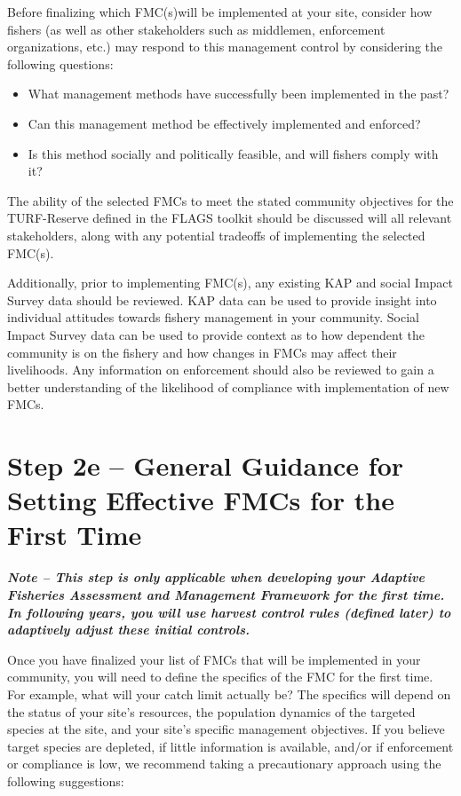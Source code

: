 \documentclass[]{book}
\begin{document}
Before finalizing which FMC(s)will be implemented at your site, consider
how fishers (as well as other stakeholders such as middlemen,
enforcement organizations, etc.) may respond to this management control
by considering the following questions:

\begin{itemize}
\item
  What management methods have successfully been implemented in the
  past?
\item
  Can this management method be effectively implemented and enforced?
\item
  Is this method socially and politically feasible, and will fishers
  comply with it?
\end{itemize}

The ability of the selected FMCs to meet the stated community objectives
for the TURF-Reserve defined in the FLAGS toolkit should be discussed
will all relevant stakeholders, along with any potential tradeoffs of
implementing the selected FMC(s).

Additionally, prior to implementing FMC(s), any existing KAP and social
Impact Survey data should be reviewed. KAP data can be used to provide
insight into individual attitudes towards fishery management in your
community. Social Impact Survey data can be used to provide context as
to how dependent the community is on the fishery and how changes in FMCs
may affect their livelihoods. Any information on enforcement should also
be reviewed to gain a better understanding of the likelihood of
compliance with implementation of new FMCs.

\section{Step 2e -- General Guidance for Setting Effective FMCs for the
First
Time}\label{step-2e-general-guidance-for-setting-effective-fmcs-for-the-first-time}

\textbf{\emph{Note -- This step is only applicable when developing your
Adaptive Fisheries Assessment and Management Framework for the first
time. In following years, you will use harvest control rules (defined
later) to adaptively adjust these initial controls.}}

Once you have finalized your list of FMCs that will be implemented in
your community, you will need to define the specifics of the FMC for the
first time. For example, what will your catch limit actually be? The
specifics will depend on the status of your site's resources, the
population dynamics of the targeted species at the site, and your site's
specific management objectives. If you believe target species are
depleted, if little information is available, and/or if enforcement or
compliance is low, we recommend taking a precautionary approach using
the following suggestions:
\end{document}
